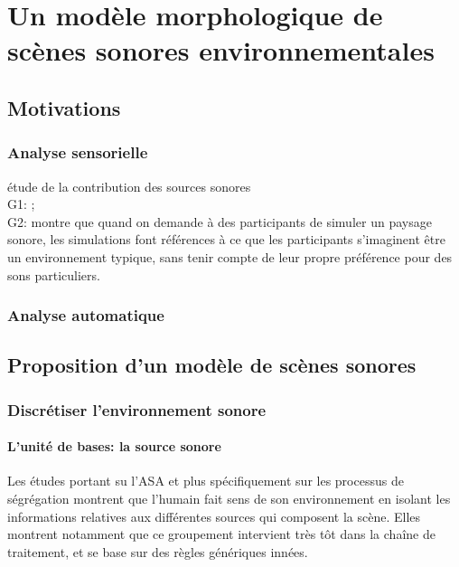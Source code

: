 \chapter{Un modèle morphologique de scènes sonores environnementales}\label{ch:psycho_model} %

\section{Motivations}

\subsection{Analyse sensorielle}

étude de la contribution des sources sonores \\

G1: \citep{bruce2009development,bruce2014effects}; \\
G2: \citep{davies2014soundscape} montre que quand on demande à des participants de simuler un paysage sonore, les simulations font références à ce que les participants s'imaginent être un environnement typique, sans tenir compte de leur propre préférence pour des sons particuliers.

\subsection{Analyse automatique}

\section{Proposition d'un modèle de scènes sonores}

\subsection{Discrétiser l'environnement sonore}

\subsubsection{L'unité de bases: la source sonore}

Les études portant su l'ASA et plus spécifiquement sur les processus de ségrégation montrent que l'humain fait sens de son environnement en isolant les informations relatives aux différentes sources qui composent la scène. Elles montrent notamment que ce groupement intervient très tôt dans la chaîne de traitement, et se base sur des règles génériques innées. \\


